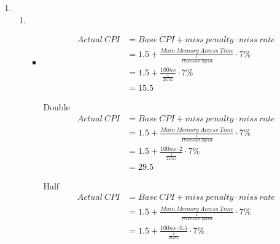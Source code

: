 \documentclass{article}
\begin{document}
\begin{enumerate}[1)]
\begin{enumerate}
        \end{enumerate}
    \item 
        \begin{enumerate}
            \item 
                \begin{itemize}
                    \item
                        \begin{equation}
                            \begin{split}
                                Actual\:CPI &= Base\:CPI + miss\:penalty \cdot miss\:rate \\
                                &=1.5 + \frac{Main\:Memory\:Access\:Time}{\frac{1}{Processor\:Speed}}  \cdot 7\%\\
                                &=1.5 + \frac{100ns}{\frac{1}{2Ghz}} \cdot 7\% \\
                                &= 15.5
                            \end{split}
                        \end{equation}
                    \item [Double]
                        \begin{equation}
                            \begin{split}
                                Actual\:CPI &= Base\:CPI + miss\:penalty \cdot miss\:rate \\
                                &=1.5 + \frac{Main\:Memory\:Access\:Time}{\frac{1}{Processor\:Speed}} \cdot 7\% \\
                                &=1.5 + \frac{100ns \cdot 2}{\frac{1}{2Ghz}} \cdot 7\% \\
                                &= 29.5
                            \end{split}
                        \end{equation}
                    \item [Half]
                        \begin{equation}
                            \begin{split}
                                Actual\:CPI &= Base\:CPI + miss\:penalty \cdot miss\:rate \\
                                &=1.5 + \frac{Main\:Memory\:Access\:Time}{\frac{1}{Processor\:Speed}} \cdot 7\% \\
                                &=1.5 + \frac{100ns \cdot 0.5}{\frac{1}{2Ghz}} \cdot 7\% \\

\end{split}
\end{equation}
\end{itemize}
\end{enumerate}
\end{enumerate}
\end{document}
